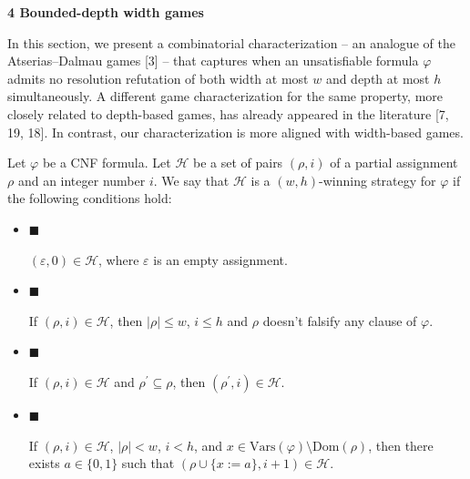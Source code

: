 \documentclass[10pt,a4paper]{article}
\begin{document}
\par\medskip\noindent\textbf{
4 Bounded-depth width games}\par


In this section, we present a combinatorial characterization – an analogue of the
Atserias–Dalmau games [3] – that captures when an unsatisfiable formula
$\varphi$ admits no resolution refutation of both width at most $w$ and depth at most $h$ simultaneously.
A different game characterization for the same property, more closely related to depth-based games,
has already appeared in the literature [7, 19, 18].
In contrast, our characterization is more aligned with width-based games.\par



Let $\varphi$ be a CNF formula. Let $\mathcal{H}$ be a set of pairs $(\rho,i)$ of a
partial assignment $\rho$ and an integer number $i$.
We say that $\mathcal{H}$ is a $(w,h)$-winning strategy for $\varphi$
if the following conditions hold:\par


\begin{itemize}


\item 
$\blacksquare$ 


$(\varepsilon,0)\in\mathcal{H}$, where $\varepsilon$ is an empty assignment.\par





\item 
$\blacksquare$ 


If $(\rho,i)\in\mathcal{H}$, then $|\rho|\leq w$, $i\leq h$ and $\rho$
doesn’t falsify any clause of $\varphi$.\par





\item 
$\blacksquare$ 


If $(\rho,i)\in\mathcal{H}$ and $\rho^{\prime}\subseteq\rho$, then
$(\rho^{\prime},i)\in\mathcal{H}$.\par





\item 
$\blacksquare$ 


If $(\rho,i)\in\mathcal{H}$, $|\rho|<w$, $i<h$,
and $x\in\mathrm{Vars}(\varphi)\setminus\mathrm{Dom}(\rho)$, then there exists $a\in\{0,1\}$
such that $(\rho\cup\{x:=a\},i+1)\in\mathcal{H}$.\par





\end{itemize}
\end{document}
